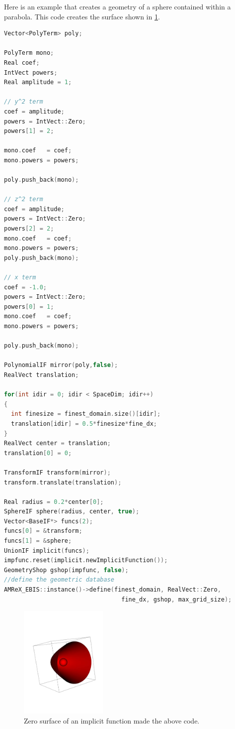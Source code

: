 Here is an example that creates a geometry of a sphere contained
within a parabola. This code
creates the surface shown in \ref{fig::parabolasphere}.

\begin{lstlisting}[language=cpp]
Vector<PolyTerm> poly;

PolyTerm mono;
Real coef;
IntVect powers;
Real amplitude = 1;

// y^2 term
coef = amplitude;
powers = IntVect::Zero;
powers[1] = 2;

mono.coef   = coef;
mono.powers = powers;

poly.push_back(mono);

// z^2 term
coef = amplitude;
powers = IntVect::Zero;
powers[2] = 2;
mono.coef   = coef;
mono.powers = powers;
poly.push_back(mono);

// x term
coef = -1.0;
powers = IntVect::Zero;
powers[0] = 1;
mono.coef   = coef;
mono.powers = powers;

poly.push_back(mono);

PolynomialIF mirror(poly,false);
RealVect translation;

for(int idir = 0; idir < SpaceDim; idir++)
{
  int finesize = finest_domain.size()[idir];
  translation[idir] = 0.5*finesize*fine_dx;
}
RealVect center = translation;
translation[0] = 0;

TransformIF transform(mirror);
transform.translate(translation);

Real radius = 0.2*center[0];
SphereIF sphere(radius, center, true);
Vector<BaseIF*> funcs(2);
funcs[0] = &transform;
funcs[1] = &sphere;
UnionIF implicit(funcs);
impfunc.reset(implicit.newImplicitFunction());
GeometryShop gshop(impfunc, false);
//define the geometric database
AMReX_EBIS::instance()->define(finest_domain, RealVect::Zero,
                                 fine_dx, gshop, max_grid_size);
\end{lstlisting}

\begin{figure}[h]
  \centering
  \includegraphics[width=0.375\textwidth]{./EB/parabsphere.pdf}
  \caption{\label{fig::parabolasphere} Zero surface of an implicit
    function made the above code.}
\end{figure}

